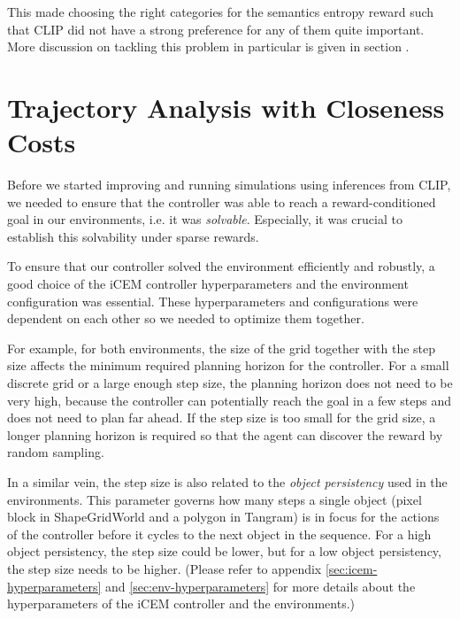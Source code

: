 
This made choosing the right categories for the semantics entropy reward such that CLIP did not have a strong preference for any of them quite important.
More discussion on tackling this problem in particular is given in section .


\section{Trajectory Analysis with Closeness Costs}
\label{sec:closeness-rollouts}
Before we started improving and running simulations using inferences from CLIP, we needed to ensure that the controller was able to reach a reward-conditioned goal in our environments, i.e. it was \emph{solvable}.
Especially, it was crucial to establish this solvability under sparse rewards.

To ensure that our controller solved the environment efficiently and robustly, a good choice of the iCEM controller hyperparameters and the environment configuration was essential.
These hyperparameters and configurations were dependent on each other so we needed to optimize them together.

For example, for both environments, the size of the grid together with the step size affects the minimum required planning horizon for the controller.
For a small discrete grid or a large enough step size, the planning horizon does not need to be very high, because the controller can potentially reach the goal in a few steps and does not need to plan far ahead.
If the step size is too small for the grid size, a longer planning horizon is required so that the agent can discover the reward by random sampling.

In a similar vein, the step size is also related to the \emph{object persistency} used in the environments.
This parameter governs how many steps a single object (pixel block in ShapeGridWorld and a polygon in Tangram) is in focus for the actions of the controller before it cycles to the next object in the sequence.
For a high object persistency, the step size could be lower, but for a low object persistency, the step size needs to be higher.
(Please refer to appendix \ref{sec:icem-hyperparameters} and \ref{sec:env-hyperparameters} for more details about the hyperparameters of the iCEM controller and the environments.)

